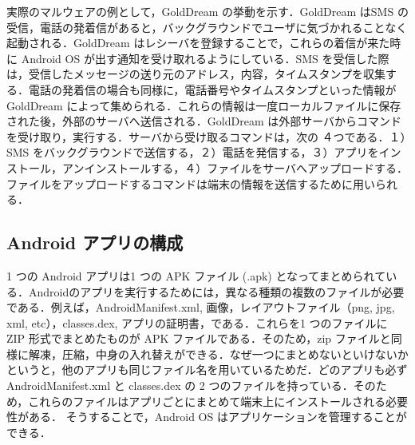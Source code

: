 \documentclass[12pt]{jsarticle}
\begin{document}
実際のマルウェアの例として，GoldDream の挙動を示す．GoldDream はSMS の受信，電話の発着信があると，バックグラウンドでユーザに気づかれることなく起動される．GoldDream はレシーバを登録することで，これらの着信が来た時に Android OS が出す通知を受け取れるようにしている．SMS を受信した際は，受信したメッセージの送り元のアドレス，内容，タイムスタンプを収集する．電話の発着信の場合も同様に，電話番号やタイムスタンプといった情報が GoldDream によって集められる．これらの情報は一度ローカルファイルに保存された後，外部のサーバへ送信される．GoldDream は外部サーバからコマンドを受け取り，実行する．サーバから受け取るコマンドは，次の ４つである．１）SMS をバックグラウンドで送信する，２）電話を発信する，３）アプリをインストール，アンインストールする，４）ファイルをサーバへアップロードする．ファイルをアップロードするコマンドは端末の情報を送信するために用いられる．

\subsection{Android アプリの構成}
\label{sec:andrapp}
1 つの Android アプリは1 つの APK ファイル (.apk) となってまとめられている．Androidのアプリを実行するためには，異なる種類の複数のファイルが必要である．例えば，AndroidManifest.xml, 画像，レイアウトファイル（png, jpg, xml, etc），classes.dex, アプリの証明書，である．これらを1 つのファイルに ZIP 形式でまとめたものが APK ファイルである．そのため，zip ファイルと同様に解凍，圧縮，中身の入れ替えができる．なぜ一つにまとめないといけないかというと，他のアプリも同じファイル名を用いているためだ．どのアプリも必ず AndroidManifest.xml と classes.dex の 2 つのファイルを持っている．そのため，これらのファイルはアプリごとにまとめて端末上にインストールされる必要性がある． そうすることで，Android OS はアプリケーションを管理することができる．
\end{document}
